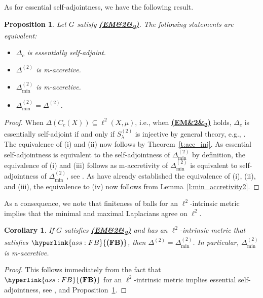 \documentclass[letterpaper]{article}
\newtheorem{proposition}[lemma]{Proposition}
\newtheorem{corollary}[lemma]{Corollary}
\theoremstyle{definition}
\theoremstyle{named}
\numberwithin{equation}{section}
\newcommand{\FB}{\hyperlink{ass:FB}{\textup{\textbf{(FB)}}}}
\newcommand{\EM}[1][]{\hyperlink{ass:EM}{\textup{\textbf{(EM\ifx&#1&\else\textsubscript{#1}\fi)}}}}
\newcommand{\lm}{\lambda}
\newcommand{\deltam}{\Delta_{\min}}
\begin{document}
As for essential self-adjointness, we have the following result.
\begin{proposition}\label{p:ESA}
    Let $G$ satisfy \EM[2]. The following statements are equivalent:
    \begin{itemize}
        \item[\textup{(i)}] $\Delta_c$ is essentially self-adjoint.
        \item[\textup{(ii)}] $\Delta^{(2)}$ is m-accretive.
        \item[\textup{(iii)}] $\deltam^{(2)}$ is m-accretive.
        \item[\textup{(iv)}] $\deltam^{(2)}=\Delta^{(2)}$.
    \end{itemize}
\end{proposition}
\begin{proof}
    When $\Delta(C_c(X)) \subseteq \ell^2(X,\mu)$, i.e., when \EM[2] holds,
    $\Delta_c$ is essentially self-adjoint
    if and only if $S_\lm^{(2)}$ is injective by general theory, e.g., \cite[Theorem~3.6]{keller2021graphs}.
    The equivalence of (i) and (ii) now follows by Theorem~\ref{t:acc_inj}. 
    As essential self-adjointness is equivalent to the self-adjointness of $\deltam^{(2)}$
    by definition, the
    equivalence of (i) and (iii) follows as m-accretivity of $\deltam^{(2)}$
    is equivalent to self-adjointness of $\deltam^{(2)}$, see
    \cite[Problem V.3.32]{kato2013perturbation}.
    { As have already established the equivalence of (i), (ii), and (iii),
    the equivalence to (iv) now follows from Lemma~\ref{l:min_accretivity2}.}
\end{proof}

As a consequence, we note that finiteness of balls for an $\ell^2$-intrinsic metric
implies that the minimal and maximal Laplacians agree on $\ell^2$.
\begin{corollary}\label{c:balls_Lap}
  If $G$ satisfies \EM[2] and has an $\ell^2$-intrinsic metric that satisfies $\FB$, then
  $\Delta^{(2)}=\Delta^{(2)}_{\min}$. In particular, $\Delta^{(2)}_{\min}$ is m-accretive.
\end{corollary}
\begin{proof}
    This follows immediately from the fact that $\FB$ for an $\ell^2$-intrinsic
    metric implies essential self-adjointness, see \cite[Theorem~12.21]{keller2021graphs}, and Proposition~\ref{p:ESA}.
\end{proof}
\end{document}
